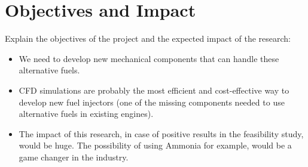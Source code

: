 \section{Objectives and Impact}
\label{sec:objectives_and_impact}

Explain the objectives of the project and the expected impact of the research:

\begin{itemize}
    \item We need to develop new mechanical components that can handle these alternative fuels.
    \item CFD simulations are probably the most efficient and cost-effective way to develop new fuel injectors (one of the missing components needed to use alternative fuels in existing engines).
    \item The impact of this research, in case of positive results in the feasibility study, would be huge. The possibility of using Ammonia for example, would be a game changer in the industry.
\end{itemize}

